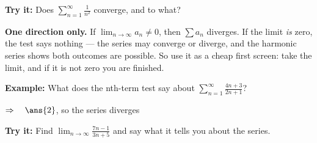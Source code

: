 \documentclass[12pt]{article}
\begin{document}
\begin{tryitbox}
\textbf{Try it:} \quad Does $\displaystyle\sum_{n=1}^{\infty}\frac{1}{n^{2}}$ converge, and to what?\\[2pt]
\end{tryitbox}


\begin{formulabox}
\textbf{One direction only.} If $\displaystyle\lim_{n\to\infty} a_{n} \neq 0$, then $\sum a_{n}$ diverges. If the limit \emph{is} zero, the test says nothing --- the series may converge or diverge, and the harmonic series shows both outcomes are possible. So use it as a cheap first screen: take the limit, and if it is not zero you are finished.
\end{formulabox}

\begin{examplebox}
\textbf{Example:} \quad What does the nth-term test say about $\displaystyle\sum_{n=1}^{\infty}\frac{4n+3}{2n+1}$?

$\Rightarrow\quad \ans{2}$, so the series diverges
\end{examplebox}

\begin{tryitbox}
\textbf{Try it:} \quad Find $\displaystyle\lim_{n\to\infty}\frac{7n-1}{3n+5}$ and say what it tells you about the series.\\[2pt]
\end{tryitbox}
\end{document}
